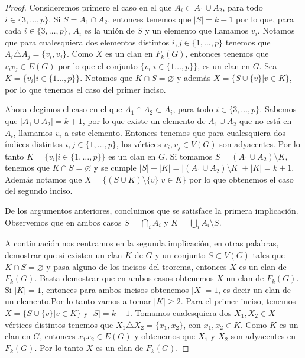 \begin{proof}
        Consideremos primero el caso en el que $A_i \subset A_1\cup A_2$, para
        todo $i\in \{3, \dots, p\}$. Si $S= A_1 \cap A_2$, entonces tenemos que
        $|S| =k-1$ por lo que, para cada $i \in \{3, \dots, p\}$, $A_i$ es la
        uni\'on de $S$ y un elemento que llamamos $v_i$. Notamos que para
        cualesquiera dos elementos distintos $i, j \in \{1, \dots, p\}$ tenemos
        que $A_i \triangle A_j = \{v_i, v_j\}$. Como $X$ es un clan en $F_k(G)$,
        entonces tenemos que $v_i{v_j} \in E(G)$ por lo que el conjunto $\{v_i|i
        \in \{1 \dots, p\}\}$, es un clan en $G$.   Sea $K = \{v_i|i \in \{1
        \dots, p\}\}$.  Notamos que  $K \cap S = \varnothing$ y adem\'as $X= \{S
        \cup \{v\}| v \in K\}$, por lo que tenemos el caso del primer inciso.

        Ahora elegimos el caso en el que $A_1 \cap A_2 \subset A_i$, para todo
        $i\in \{3, \dots, p\}$. Sabemos que $|A_1 \cup A_2| = k+1$, por lo que
        existe un elemento de $A_1 \cup A_2$ que no est\'a en $A_i$, llamamos
        $v_i$ a este elemento. Entonces tenemos que para cualesquiera dos
        \'indices distintos $i, j \in \{1, \dots, p\}$, los v\'ertices $v_i, v_j
        \in V(G)$ son adyacentes. Por lo tanto $K= \{v_i| i \in \{1, \dots,
        p\}\}$ es un clan en $G$. Si tomamos $S= (A_1 \cup A_2)\setminus K$,
        tenemos que $K \cap S = \varnothing$ y se cumple $|S| + |K|= |(A_1 \cup
        A_2)\setminus K| + |K| = k+1$. Adem\'as notamos que $X = \{(S \cup
        K)\setminus \{v\}|v\in K\}$ por lo que obtenemos el caso del segundo
        inciso.

        De los argumentos anteriores, concluimos que se satisface la primera
        implicaci\'on. Observemos que en ambos casos $S = \bigcap\limits_{i}
        A_i$ y $K = \bigcup\limits_{i} A_i \setminus S$.
        
        A continuaci\'on nos centramos en la segunda implicaci\'on, en otras
        palabras, demostrar que si existen un clan $K$ de $G$ y un conjunto $S
        \subset V(G)$ tales que $K \cap S = \varnothing$ y pasa alguno de los
        incisos del teorema, entonces $X$ es un clan de $F_k(G)$. Basta
        demostrar que en ambos casos obtenemos $X$ un clan de $F_k(G)$. Si $|K|
        =1$, entonces para ambos incisos obtenemos $|X| =1$, es decir un clan de
        un elemento.Por lo tanto vamos a tomar $|K| \geq 2$. Para el primer
        inciso, tenemos $X = \{S \cup \{v\}| v \in K\}$ y $|S| = k-1$. Tomamos
        cualesquiera dos $X_1, X_2 \in X$ v\'ertices distintos tenemos que $X_1
        \triangle X_2 =\{x_1, x_2\}$, con $x_1, x_2 \in K$. Como $K$ es un clan
        en $G$, entonces $x_1x_2 \in E(G)$ y obtenemos que $X_1$ y $X_2$ son
        adyacentes en $F_k(G)$. Por lo tanto $X$ es un clan de $F_k(G)$.


\end{proof}
